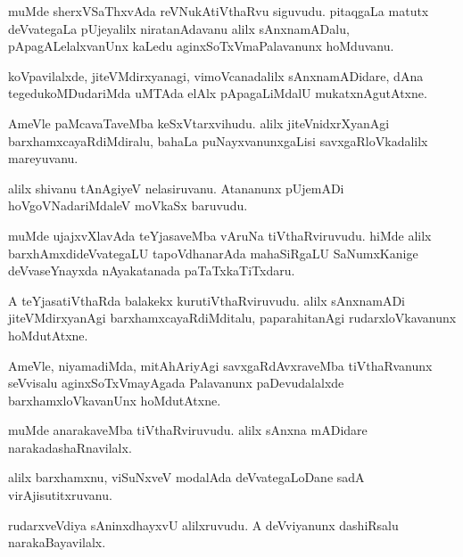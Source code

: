 \documentclass{article}
\begin{document}
\begin{mn}
muMde sherxVSaThxvAda reVNukAtiVthaRvu siguvudu. pitaqgaLa matutx deVvategaLa pUjeyalilx 
niratanAdavanu alilx sAnxnamADalu, pApagALelalxvanUnx kaLedu aginxSoTxVmaPalavanunx hoMduvanu.
\end{mn}

\begin{mn}
koVpavilalxde, jiteVMdirxyanagi, vimoVcanadalilx sAnxnamADidare, dAna tegedukoMDudariMda uMTAda
elAlx pApagaLiMdalU mukatxnAgutAtxne.
\end{mn}

\begin{mn}
AmeVle paMcavaTaveMba keSxVtarxvihudu. alilx jiteVnidxrXyanAgi barxhamxcayaRdiMdiralu, bahaLa 
puNayxvanunxgaLisi savxgaRloVkadalilx mareyuvanu.
\end{mn}

\begin{mn}
alilx shivanu tAnAgiyeV nelasiruvanu. Atananunx pUjemADi hoVgoVNadariMdaleV moVkaSx baruvudu.
\end{mn}

\begin{mn}
muMde ujajxvXlavAda teYjasaveMba vAruNa tiVthaRviruvudu. hiMde alilx barxhAmxdideVvategaLU
tapoVdhanarAda mahaSiRgaLU SaNumxKanige deVvaseYnayxda nAyakatanada paTaTxkaTiTxdaru.
\end{mn}

\begin{mn}
A teYjasatiVthaRda balakekx kurutiVthaRviruvudu. alilx sAnxnamADi jiteVMdirxyanAgi 
barxhamxcayaRdiMditalu, paparahitanAgi rudarxloVkavanunx hoMdutAtxne.
\end{mn}

\begin{mn}
AmeVle, niyamadiMda, mitAhAriyAgi savxgaRdAvxraveMba tiVthaRvanunx seVvisalu aginxSoTxVmayAgada 
Palavanunx paDevudalalxde barxhamxloVkavanUnx hoMdutAtxne.
\end{mn}

\begin{mn}
muMde anarakaveMba tiVthaRviruvudu. alilx sAnxna mADidare narakadashaRnavilalx.
\end{mn}

\begin{mn}
alilx barxhamxnu, viSuNxveV modalAda deVvategaLoDane sadA virAjisutitxruvanu.
\end{mn}

\begin{mn}
rudarxveVdiya sAninxdhayxvU alilxruvudu. A deVviyanunx dashiRsalu narakaBayavilalx.
\end{mn}
\end{document}
